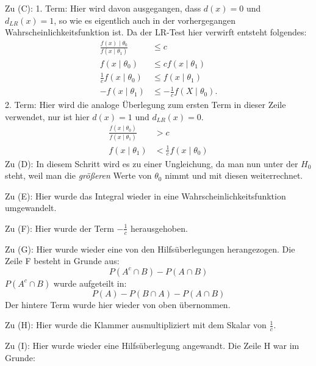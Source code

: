\documentclass[10pt]{article}
\newcommand{\dlr}{d_{LR}}%
\newenvironment{BWS}[1][]
{\begin{Beweis}[frametitle=#1]}{\end{Beweis}}
\begin{document}
\begin{BWS}[Beweis 2.1.1 (NP-Lemma)]
			Zu (C): 1. Term: Hier wird davon ausgegangen, dass $d(x) =0$ und $\dlr(x) = 1$, so wie es eigentlich auch in der vorhergegangen Wahrscheinlichkeitsfunktion ist. Da der LR-Test hier verwirft entsteht folgendes:
			\begin{equation*}
				\begin{split}
					\frac{f(x) \mid \theta_0}{f(x\mid \theta_1)} &\leq c \\
					f(x\mid \theta_0) &\leq c f(x\mid \theta_1)\\
					\frac{1}{c} f(x\mid \theta_0) &\leq f(x\mid \theta_1)\\
					-f(x\mid \theta_1) &\leq -\frac{1}{c} f(X\mid \theta_0).
				\end{split}
			\end{equation*}
			2. Term: Hier wird die analoge Überlegung zum ersten Term in dieser Zeile verwendet, nur ist hier $d(x) = 1$ und $\dlr(x)=0$. 
			\begin{equation*}
				\begin{split}
					\frac{f(x \mid \theta_0)}{f(x\mid \theta_1)} &> c \\
					f(x\mid \theta_1) &< \frac{1}{c} f(x \mid \theta_0)
				\end{split}
			\end{equation*}
			Zu (D): In diesem Schritt wird es zu einer Ungleichung, da man nun unter der $H_0$ steht, weil man die \textit{größeren} Werte von $\theta_0$ nimmt und mit diesen weiterrechnet.
			
			Zu (E): Hier wurde das Integral wieder in eine Wahrscheinlichkeitsfunktion umgewandelt.
			
			Zu (F): Hier wurde der Term $-\frac{1}{c}$ herausgehoben.
			
			Zu (G): Hier wurde wieder eine von den Hilfsüberlegungen herangezogen. Die Zeile F besteht in Grunde aus: 
			\begin{equation*}
				P(A^c \cap B) - P(A \cap B)
			\end{equation*}
			$P(A^c \cap B)$ wurde aufgeteilt in:
			\begin{equation*}
				P(A) - P(B \cap A) - P(A \cap B)
			\end{equation*}
			Der hintere Term wurde hier wieder von oben übernommen.
			
			Zu (H): Hier wurde die Klammer ausmultipliziert mit dem Skalar von $\frac{1}{c}$. 
			
			Zu (I): Hier wurde wieder eine Hilfsüberlegung angewandt. Die Zeile H war im Grunde:
			

\end{BWS}
\end{document}
